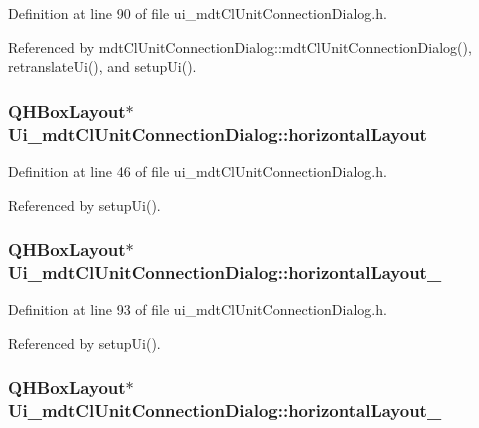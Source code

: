 Definition at line 90 of file ui\-\_\-mdt\-Cl\-Unit\-Connection\-Dialog.\-h.



Referenced by mdt\-Cl\-Unit\-Connection\-Dialog\-::mdt\-Cl\-Unit\-Connection\-Dialog(), retranslate\-Ui(), and setup\-Ui().

\hypertarget{class_ui__mdt_cl_unit_connection_dialog_a2768de641bcfd7b51708846446f53839}{
\subsubsection[{horizontal\-Layout}]{\setlength{\rightskip}{0pt plus 5cm}Q\-H\-Box\-Layout$\ast$ Ui\-\_\-mdt\-Cl\-Unit\-Connection\-Dialog\-::horizontal\-Layout}}\label{class_ui__mdt_cl_unit_connection_dialog_a2768de641bcfd7b51708846446f53839}


Definition at line 46 of file ui\-\_\-mdt\-Cl\-Unit\-Connection\-Dialog.\-h.



Referenced by setup\-Ui().

\hypertarget{class_ui__mdt_cl_unit_connection_dialog_a548ef6d834725442ecefe1700dd419ec}{
\subsubsection[{horizontal\-Layout\-\_\-10}]{\setlength{\rightskip}{0pt plus 5cm}Q\-H\-Box\-Layout$\ast$ Ui\-\_\-mdt\-Cl\-Unit\-Connection\-Dialog\-::horizontal\-Layout\-\_}}\label{class_ui__mdt_cl_unit_connection_dialog_a548ef6d834725442ecefe1700dd419ec}


Definition at line 93 of file ui\-\_\-mdt\-Cl\-Unit\-Connection\-Dialog.\-h.



Referenced by setup\-Ui().

\hypertarget{class_ui__mdt_cl_unit_connection_dialog_a33d0f0100bc144b8a383f5140afbadc0}{
\subsubsection[{horizontal\-Layout\-\_\-11}]{\setlength{\rightskip}{0pt plus 5cm}Q\-H\-Box\-Layout$\ast$ Ui\-\_\-mdt\-Cl\-Unit\-Connection\-Dialog\-::horizontal\-Layout\-\_}}\label{class_ui__mdt_cl_unit_connection_dialog_a33d0f0100bc144b8a383f5140afbadc0}


